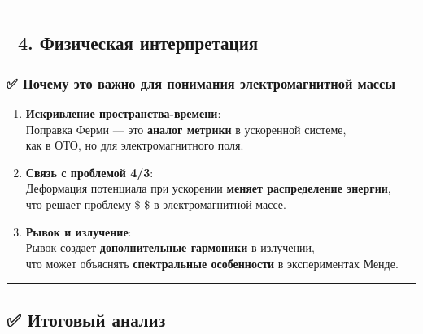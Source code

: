 \documentclass[11pt]{article}
\begin{document}
\begin{center}\rule{0.5\linewidth}{\linethickness}\end{center}

\subsection{🔹 4. Физическая
интерпретация}\label{ux444ux438ux437ux438ux447ux435ux441ux43aux430ux44f-ux438ux43dux442ux435ux440ux43fux440ux435ux442ux430ux446ux438ux44f-1}

\subsubsection{✅ Почему это важно для понимания электромагнитной
массы}\label{ux43fux43eux447ux435ux43cux443-ux44dux442ux43e-ux432ux430ux436ux43dux43e-ux434ux43bux44f-ux43fux43eux43dux438ux43cux430ux43dux438ux44f-ux44dux43bux435ux43aux442ux440ux43eux43cux430ux433ux43dux438ux442ux43dux43eux439-ux43cux430ux441ux441ux44b}

\begin{enumerate}
\def\labelenumi{\arabic{enumi}.}
\item
  \textbf{Искривление пространства-времени}:\\
  Поправка Ферми --- это \textbf{аналог метрики} в ускоренной системе,\\
  как в ОТО, но для электромагнитного поля.
\item
  \textbf{Связь с проблемой 4/3}:\\
  Деформация потенциала при ускорении \textbf{меняет распределение
  энергии},\\
  что решает проблему \$  \$ в электромагнитной массе.
\item
  \textbf{Рывок и излучение}:\\
  Рывок создает \textbf{дополнительные гармоники} в излучении,\\
  что может объяснять \textbf{спектральные особенности} в экспериментах
  Менде.
\end{enumerate}

\begin{center}\rule{0.5\linewidth}{\linethickness}\end{center}

\subsection{✅ Итоговый
анализ}\label{ux438ux442ux43eux433ux43eux432ux44bux439-ux430ux43dux430ux43bux438ux437-10}
\end{document}
